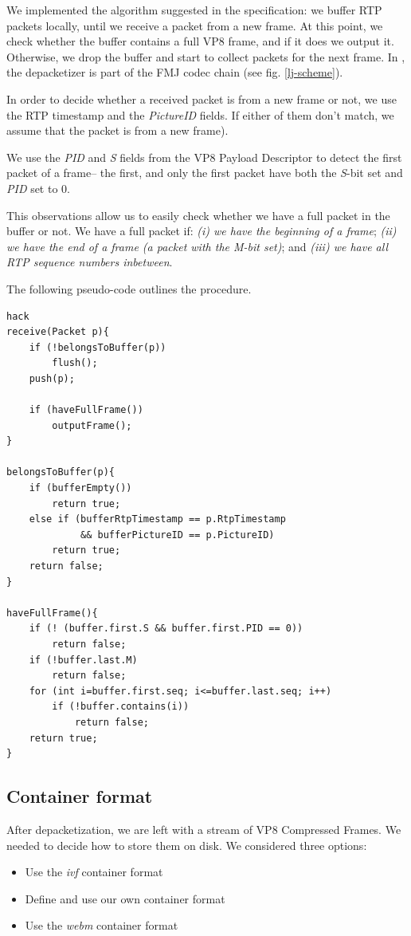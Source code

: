 \documentclass[twoside,openright,a4paper,12pt,english]{article}
\begin{document}
We implemented the algorithm suggested in the specification: we buffer RTP
packets locally, until we receive a packet from a new frame. At this point, we
check whether the buffer contains a full VP8 frame, and if it does we output
it. Otherwise, we drop the buffer and start to collect packets for the next
frame. In \lj, the depacketizer is part of the FMJ codec chain (see fig. \ref{lj-scheme}).

In order to decide whether a received packet is from a new frame or not, we use the
RTP timestamp and the \emph{PictureID} fields.  If either of them don't match,
we assume that the packet is from a new frame). 

We use the \emph{PID} and \emph{S} fields from the VP8 Payload Descriptor to
detect the first packet of a frame-- the first, and only the first packet
have both the \emph{S}-bit set and \emph{PID} set to 0.

This observations allow us to easily check whether we have a full packet
in the buffer or not. We have a full packet if: \emph{(i) we have the beginning
of a frame}; \emph{(ii) we have the end of a frame (a packet with the M-bit
set)}; and \emph{(iii) we have
all RTP sequence numbers inbetween}.

The following pseudo-code outlines the procedure.

\begin{lstlisting}[frame=single]  % Start your code-block
hack
receive(Packet p){
    if (!belongsToBuffer(p))
        flush();
    push(p);

    if (haveFullFrame())
        outputFrame();
}

belongsToBuffer(p){
    if (bufferEmpty())
        return true;
    else if (bufferRtpTimestamp == p.RtpTimestamp 
             && bufferPictureID == p.PictureID)
        return true;
    return false;
}

haveFullFrame(){
    if (! (buffer.first.S && buffer.first.PID == 0))
        return false;
    if (!buffer.last.M)
        return false;
    for (int i=buffer.first.seq; i<=buffer.last.seq; i++)
        if (!buffer.contains(i))
            return false;
    return true;
}
\end{lstlisting}


\subsection{Container format}
After depacketization, we are left with a stream of VP8 Compressed Frames. We needed to decide how to store them on disk. We considered three options:
\begin{itemize}
\item Use the \emph{ivf} container format
\item Define and use our own container format
\item Use the \emph{webm} container format
\end{itemize}
\end{document}
